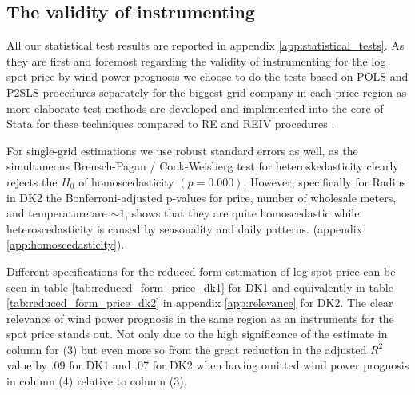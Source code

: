 \subsection{The validity of instrumenting}
\label{subsec:r_validity}
All our statistical test results are reported in appendix \ref{app:statistical_tests}. As they are first and foremost regarding the validity of instrumenting for the log spot price by wind power prognosis we choose to do the tests based on POLS and P2SLS procedures separately for the biggest grid company in each price region as more elaborate test methods are developed and implemented into the core of Stata for these techniques compared to RE and REIV procedures \citep{statacorp2017stata}.
\bigskip\par
For single-grid estimations we use robust standard errors as well, as the simultaneous Breusch-Pagan / Cook-Weisberg test for heteroskedasticity clearly rejects the $H_0$ of homoscedasticity $(p=0.000)$. However, specifically for Radius in DK2 the Bonferroni-adjusted p-values for price, number of wholesale meters, and temperature are $\sim1$, shows that they are quite homoscedastic while heteroscedasticity is caused by seasonality and daily patterns.
 (appendix \ref{app:homoscedasticity}).
\bigskip\par
Different specifications for the reduced form estimation of log spot price can be seen in table \ref{tab:reduced_form_price_dk1} for DK1 and equivalently in table \ref{tab:reduced_form_price_dk2} in appendix \ref{app:relevance} for DK2. The clear relevance of wind power prognosis in the same region as an instruments for the spot price stands out. Not only due to the high significance of the estimate in column for (3) but even more so from the great reduction in the adjusted $R^2$ value by .09 for DK1 and .07 for DK2 when having omitted wind power prognosis in column (4) relative to column (3).
\par
